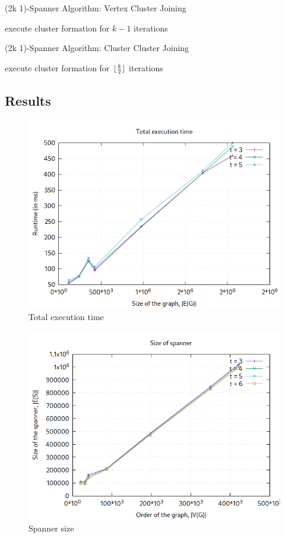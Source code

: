 \documentclass[a4paper]{article}
\DeclarePairedDelimiter\floor{\lfloor}{\rfloor}
\begin{document}
\begin{algorithm}[H]
\caption{(2k \textminus{} 1)-Spanner Algorithm: Vertex Cluster Joining}
\label{alg:vertex_cluster_joining}
execute cluster formation for $k - 1$ iterations \\
\end{algorithm}

\begin{algorithm}[H]
\caption{(2k \textminus{} 1)-Spanner Algorithm: Cluster Cluster Joining}
\label{alg:cluster_cluster_joining}
execute cluster formation for $\floor{\frac{k}{2}}$ iterations \\
\end{algorithm}

\subsection{Results}

\begin{figure}[H]
    \centering
    \includegraphics[width=.55\textwidth]{plots/2k-1-spanner/execution_time.png}
    \caption{Total execution time}
\end{figure}

\begin{figure}[H]
    \centering
    \includegraphics[width=.55\textwidth]{plots/2k-1-spanner/spanner_size.png}
    \caption{Spanner size}
\end{figure}
\end{document}
